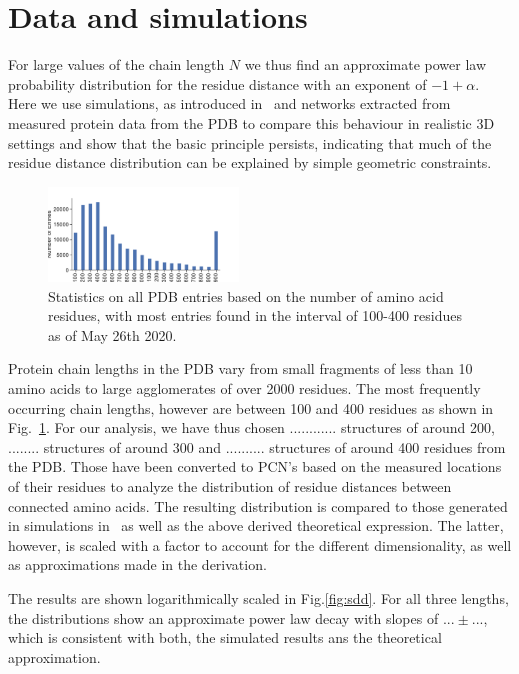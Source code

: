 \documentclass[
reprint,
twocolumn,
amsmath,amssymb,superscriptaddress,aps,
pre]{revtex4-1}
\newcommand{\red}[1]{\textcolor{red!80!black}{#1}}
\begin{document}
\section*{Data and simulations}
For large values of the chain length $N$ we thus find an approximate power law probability distribution for the residue distance with an exponent of $-1+\alpha$. Here we use simulations, as introduced in~\cite{molkenthin2020self} and networks extracted from measured protein data from the PDB \cite{PDB} to compare this behaviour in realistic 3D settings and show that the basic principle persists, indicating that much of the residue distance distribution can be explained by simple geometric constraints.
 \begin{figure}[h]
        \centering
	\includegraphics[width=0.45\textwidth]{paper/figures/Fig2/pdb_statistics.pdf}
        \caption{Statistics on all PDB entries based on the number of amino acid residues, with most entries found in the interval of 100-400 residues as of May 26th 2020.}
        \label{fig:pdb_stats}
\end{figure}

Protein chain lengths in the PDB vary from small fragments of less than 10 amino acids to large agglomerates of over 2000 residues. The most frequently occurring chain lengths, however are between 100 and 400 residues as shown in Fig.~\ref{fig:pdb_stats}. \red{For our analysis, we have thus chosen ............ structures of around 200, ........ structures of around 300 and .......... structures of around 400 residues from the PDB.} Those have been converted to PCN's based on the measured locations of their residues to analyze the distribution of residue distances between connected amino acids. The resulting distribution is compared to those generated in simulations in~\cite{molkenthin2020self} as well as the above derived theoretical expression. The latter, however, is scaled with a factor to account for the different dimensionality, as well as approximations made in the derivation.

The results are shown logarithmically scaled in Fig.\ref{fig:sdd}. \red{For all three lengths, the distributions show an approximate power law decay with slopes of $...\pm ...$, which is consistent with both, the simulated results ans the theoretical approximation.}
\end{document}
